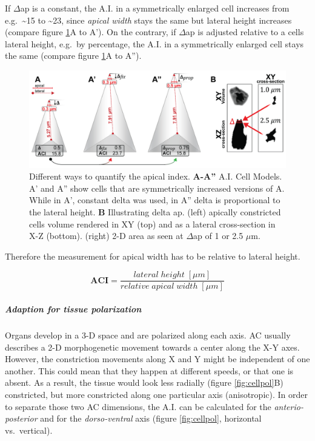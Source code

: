 \documentclass[11pt,singlespacinge,twoside]{reedthesis} %
\theoremstyle{definition}
\theoremstyle{definition}
\theoremstyle{definition}
\theoremstyle{remark}
\begin{document}
If \(\Delta\)ap is a constant, the A.I. in a symmetrically enlarged cell increases from e.g.~\textasciitilde15 to \textasciitilde23, since \emph{apical width} stays the same but lateral height increases (compare figure \ref{fig:ACICells}A to A'). On the contrary, if \(\Delta\)ap is adjusted relative to a cells lateral height, e.g.~by percentage, the A.I. in a symmetrically enlarged cell stays the same (compare figure \ref{fig:ACICells}A to A'').


\begin{figure}[H]

{\centering \includegraphics[width=0.85\linewidth]{figures/summary/aci_fig-01} 

}

\caption[Different ways to quantify the apical index]{Different ways to quantify the apical index. \textbf{A-A''} A.I. Cell Models. A' and A'' show cells that are symmetrically increased versions of A. While in A', constant delta was used, in A'' delta is proportional to the lateral height. \textbf{B} Illustrating delta ap. (left) apically constricted cells volume rendered in XY (top) and as a lateral cross-section in X-Z (bottom). (right) 2-D area as seen at \(\Delta\)ap of 1 or 2.5 \(\mu\)m.}\label{fig:ACICells}
\end{figure}
Therefore the measurement for apical width has to be relative to lateral height.

\[\mathbf{ACI} = \frac{lateral\;height\;[\mu m]}{relative\;apical\;width\;[\mu m]}\]

\hypertarget{ACI-pol}{%
\subparagraph{Adaption for tissue polarization}\label{ACI-pol}}

Organs develop in a 3-D space and are polarized along each axis. AC usually describes a 2-D morphogenetic movement towards a center along the X-Y axes. However, the constriction movements along X and Y might be independent of one another. This could mean that they happen at different speeds, or that one is absent. As a result, the tissue would look less radially (figure \ref{fig:cellpol}B) constricted, but more constricted along one particular axis (anisotropic). In order to separate those two AC dimensions, the A.I. can be calculated for the \emph{anterio-posterior} and for the \emph{dorso-ventral} axis (figure \ref{fig:cellpol}, horizontal vs.~vertical).
\end{document}
